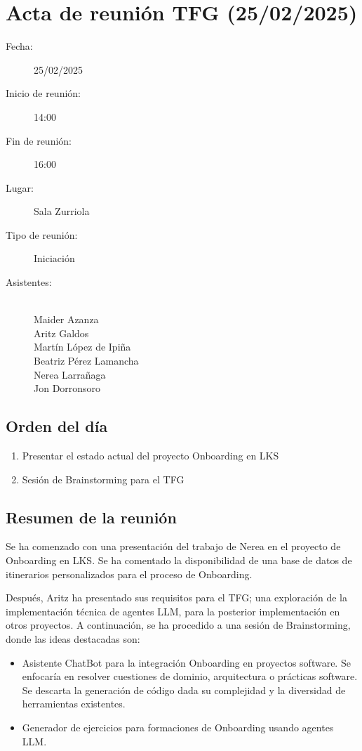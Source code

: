 
\section{Acta de reunión TFG (25/02/2025)}

\begin{description}
    \item[Fecha:] 25/02/2025
    \item[Inicio de reunión:] 14:00
    \item[Fin de reunión:] 16:00
    \item[Lugar:] Sala Zurriola
    \item[Tipo de reunión:] Iniciación
    \item[Asistentes:] ~\\
    Maider Azanza\\
    Aritz Galdos\\
    Martín López de Ipiña\\
    Beatriz Pérez Lamancha\\
    Nerea Larrañaga\\
    Jon Dorronsoro
\end{description}

\subsection{Orden del día}
\begin{enumerate}
    \item Presentar el estado actual del proyecto Onboarding en LKS
    \item Sesión de Brainstorming para el TFG
\end{enumerate}

\subsection{Resumen de la reunión}
Se ha comenzado con una presentación del trabajo de Nerea en el proyecto de Onboarding en LKS. Se ha comentado la disponibilidad de una base de datos de itinerarios personalizados para el proceso de Onboarding. 

Después, Aritz ha presentado sus requisitos para el TFG; una exploración de la implementación técnica de agentes LLM, para la posterior implementación en otros proyectos. A continuación, se ha procedido a una sesión de Brainstorming, donde las ideas destacadas son: 
\begin{itemize}
    \item Asistente ChatBot para la integración Onboarding en proyectos software. Se enfocaría en resolver cuestiones de dominio, arquitectura o prácticas software. Se descarta la generación de código dada su complejidad y la diversidad de herramientas existentes.
    \item Generador de ejercicios para formaciones de Onboarding usando agentes LLM. 
\end{itemize}

